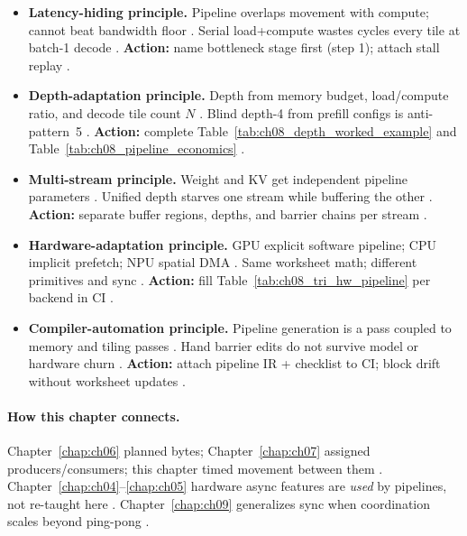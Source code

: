 \begin{itemize}
\item \textbf{Latency-hiding principle.}
Pipeline overlaps movement with compute; cannot beat bandwidth floor \citep{memoryfloor2026,semianalysis2024tma,patel2025llminference}.
Serial load+compute wastes cycles every tile at batch-1 decode \citep{taxbreak2026,kwon2023vllm}.
\textbf{Action:} name bottleneck stage first (step 1); attach stall replay \citep{shah2024flashattention3,yirage2026}.

\item \textbf{Depth-adaptation principle.}
Depth from memory budget, load/compute ratio, and decode tile count $N$ \citep{dao2022flashattention,chen2020compilerbasedhardw,taxbreak2026}.
Blind depth-4 from prefill configs is anti-pattern~5 \citep{shah2024flashattention3,patel2025llminference}.
\textbf{Action:} complete Table~\ref{tab:ch08_depth_worked_example} and Table~\ref{tab:ch08_pipeline_economics} \citep{yirage2026,memoryfloor2026}.

\item \textbf{Multi-stream principle.}
Weight and KV get independent pipeline parameters \citep{kwon2023vllm,dao2023flashdecoding,shah2024flashattention3}.
Unified depth starves one stream while buffering the other \citep{patel2025llminference,yirage2026}.
\textbf{Action:} separate buffer regions, depths, and barrier chains per stream \citep{semianalysis2024tma,dao2022flashattention}.

\item \textbf{Hardware-adaptation principle.}
GPU explicit software pipeline; CPU implicit prefetch; NPU spatial DMA \citep{nvidia2022hopper,dlbook,amd2024xdna,amd2024aie}.
Same worksheet math; different primitives and sync \citep{yirage2026,chen2020compilerbasedhardw,taxbreak2026}.
\textbf{Action:} fill Table~\ref{tab:ch08_tri_hw_pipeline} per backend in CI \citep{patel2025llminference,amd2024aie}.

\item \textbf{Compiler-automation principle.}
Pipeline generation is a pass coupled to memory and tiling passes \citep{yirage2026,wu2024mirage,mpk2025,shah2024flashattention3}.
Hand barrier edits do not survive model or hardware churn \citep{chen2020compilerbasedhardw,semianalysis2024tma}.
\textbf{Action:} attach pipeline IR + checklist to CI; block drift without worksheet updates \citep{yirage2026,taxbreak2026}.
\end{itemize}

\paragraph{How this chapter connects.}
Chapter~\ref{chap:ch06} planned bytes; Chapter~\ref{chap:ch07} assigned producers/consumers; this chapter timed movement between them \citep{dao2022flashattention,shah2024flashattention3,semianalysis2024tma}.
Chapter~\ref{chap:ch04}--\ref{chap:ch05} hardware async features are \emph{used} by pipelines, not re-taught here \citep{nvidia2022hopper,amd2024xdna,patel2025llminference}.
Chapter~\ref{chap:ch09} generalizes sync when coordination scales beyond ping-pong \citep{taxbreak2026,yirage2026,chen2020compilerbasedhardw}.


